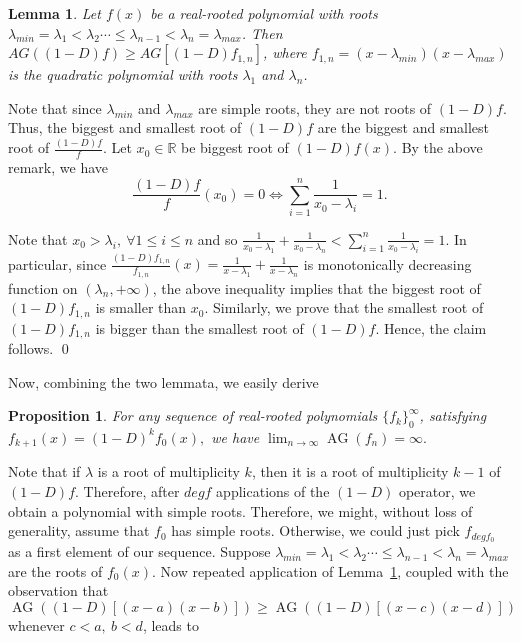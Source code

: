 \documentclass[11pt]{article}
\DeclareMathOperator{\AG}{AG}
\newtheorem{lemma}[theorem]{Lemma}
\newtheorem{proposition}[theorem]{Proposition}
\begin{document}
\begin{lemma}
\label{degree two - slowest movement}
Let $f(x)$ be a real-rooted polynomial with roots $\lambda_{min}=\lambda_1 < \lambda_2 \cdots \leq \lambda_{n-1} < \lambda_n = \lambda_{max}$. Then $AG((1-D)f) \geq AG[(1-D)f_{1,n}]$, where $f_{1,n} = (x - \lambda_{min})(x - \lambda_{max})$ is the quadratic polynomial with roots $\lambda_1$ and $\lambda_n$.
\end{lemma}
\proof Note that since $\lambda_{min}$ and $\lambda_{max}$ are simple roots, they are not roots of $(1-D)f$. Thus, the biggest and smallest root of $(1-D)f$ are the biggest and smallest root of $\frac{(1-D)f}{f}$. Let $x_0\in\mathbb{R}$ be biggest root of $(1-D)f(x)$. By the above remark, we have
\[\frac{(1-D)f}{f}(x_0) = 0 \Leftrightarrow \sum_{i=1}^n \frac{1}{x_0 - \lambda_i} = 1.\]

Note that $x_0 > \lambda_i,~\forall 1\leq i \leq n$ and so $\frac{1}{x_0 - \lambda_1} + \frac{1}{x_0 - \lambda_n} < \sum_{i=1}^n \frac{1}{x_0 - \lambda_i} = 1.$ In particular, since $\frac{(1-D)f_{1,n}}{f_{1,n}}(x) = \frac{1}{x - \lambda_1} + \frac{1}{x - \lambda_n}$ is monotonically decreasing function on $(\lambda_n, +\infty)$, the above inequality implies that the biggest root of $(1-D)f_{1,n}$ is smaller than $x_0$. Similarly, we prove that the smallest root of $(1-D)f_{1,n}$ is bigger than the smallest root of $(1-D)f$. Hence, the claim follows. \qed

Now, combining the two lemmata, we easily derive

\begin{proposition}For any sequence of real-rooted polynomials $\{f_k\}_0^{\infty}$, satisfying $f_{k+1}(x) = (1-D)^k f_{0}(x),$ we have $\lim_{n\to \infty} \AG(f_n) =  \infty.$
\end{proposition}
\label{avg gap goes to infty}
\proof Note that if $\lambda$ is a root of multiplicity $k$, then it is a root of multiplicity $k-1$ of $(1-D)f$. Therefore, after $deg f$ applications of the $(1-D)$ operator, we obtain a polynomial with simple roots. Therefore, we might, without loss of generality, assume that $f_0$ has simple roots. Otherwise, we could just pick $f_{deg f_0}$ as a first element of our sequence. Suppose $\lambda_{min}=\lambda_1 < \lambda_2 \cdots \leq \lambda_{n-1} < \lambda_n = \lambda_{max}$ are the roots of $f_0(x)$. Now repeated application of Lemma~\ref{degree two - slowest movement}, coupled with the observation that $\AG((1-D)[(x-a)(x-b)]) \geq \AG((1-D)[(x-c)(x-d)])$ whenever $c < a,~b<d$, leads to
\end{document}
